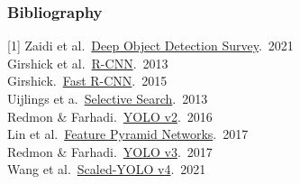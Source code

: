 \documentclass[xetex,professionalfont]{beamer}
\let\oldemph\emph
\renewcommand\emph[1]{\textcolor{tuwcvl_cvl_blue}{#1}}
\begin{document}
\renewcommand\emph[1]{\oldemph{#1}}

\begin{frame}
	\frametitle{Bibliography}

	[1] Zaidi et al.~\href{https://arxiv.org/abs/2104.11892}{Deep Object Detection Survey}.~2021 \\\medskip
	[2] Girshick et al.~\href{https://arxiv.org/abs/1311.2524}{R-CNN}.~2013 \\\medskip
	[3] Girshick.~\href{https://arxiv.org/abs/1504.08083}{Fast R-CNN}.~2015 \\\medskip
	[4] Uijlings et a.~\href{https://staff.fnwi.uva.nl/th.gevers/pub/GeversIJCV2013.pdf}{Selective Search}.~2013 \\\medskip
	[5] Redmon \& Farhadi.~\href{https://arxiv.org/abs/1612.08242v1}{YOLO v2}.~2016 \\\medskip
	[6] Lin et al.~\href{https://arxiv.org/abs/1612.03144}{Feature Pyramid Networks}.~2017 \\\medskip
	[7] Redmon \& Farhadi.~\href{https://pjreddie.com/media/files/papers/YOLOv3.pdf}{YOLO v3}.~2017 \\\medskip
	[8] Wang et al.~\href{https://arxiv.org/abs/2011.08036v2}{Scaled-YOLO v4}.~2021

\end{frame}
\end{document}
